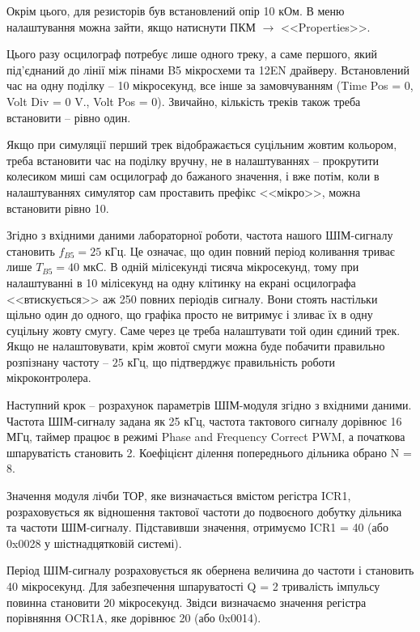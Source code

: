 \documentclass[14pt, a4paper]{extreport}
\begin{document}
	
	Окрім цього, для резисторів був встановлений опір 10 кОм. В меню налаштування можна зайти, якщо натиснути ПКМ $\rightarrow$ <<Properties>>.
	
	
	Цього разу осцилограф потребує лише одного треку, а саме першого, який під'єднаний до лінії між пінами B5 мікросхеми та 12EN драйверу. Встановлений час на одну поділку -- 10 мікросекунд, все інше за замовчуванням (Time Pos = 0, Volt Div = 0 V., Volt Pos = 0). Звичайно, кількість треків також треба встановити -- рівно один.
	
	Якщо при симуляції перший трек відображається суцільним жовтим кольором, треба встановити час на поділку вручну, не в налаштуваннях -- прокрутити колесиком миші сам осцилограф до бажаного значення, і вже потім, коли в налаштуваннях симулятор сам проставить префікс <<мікро>>, можна встановити рівно 10.
	
	
	Згідно з вхідними даними лабораторної роботи, частота нашого ШІМ-сигналу становить $f_{B5} = 25$ кГц. Це означає, що один повний період коливання триває лише $T_{B5} = 40$ мкС. В одній мілісекунді тисяча мікросекунд, тому при налаштуванні в 10 мілісекунд на одну клітинку на екрані осцилографа <<втискується>> аж 250 повних періодів сигналу. Вони стоять настільки щільно один до одного, що графіка просто не витримує і зливає їх в одну суцільну жовту смугу. Саме через це треба налаштувати той один єдиний трек. Якщо не налаштовувати, крім жовтої смуги можна буде побачити правильно розпізнану частоту -- $25$ кГц, що підтверджує правильність роботи мікроконтролера.
	
	Наступний крок -- розрахунок параметрів ШІМ-модуля згідно з вхідними даними. Частота ШІМ-сигналу задана як 25 кГц, частота тактового сигналу дорівнює 16 МГц, таймер працює в режимі Phase and Frequency Correct PWM, а початкова шпаруватість становить 2. Коефіцієнт ділення попереднього дільника обрано N = 8.
	
	Значення модуля лічби ТОР, яке визначається вмістом регістра ICR1, розраховується як відношення тактової частоти до подвоєного добутку дільника та частоти ШІМ-сигналу. Підставивши значення, отримуємо ICR1 = 40 (або 0x0028 у шістнадцятковій системі).
	
	Період ШІМ-сигналу розраховується як обернена величина до частоти і становить 40 мікросекунд. Для забезпечення шпаруватості Q = 2 тривалість імпульсу повинна становити 20 мікросекунд. Звідси визначаємо значення регістра порівняння OCR1A, яке дорівнює 20 (або 0x0014).
	
\end{document}
